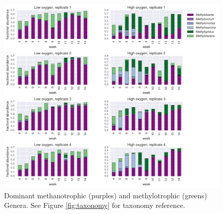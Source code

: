 \begin{figure}[H]
\centering
    \includegraphics[width=1.0\textwidth]{./tex/chapter2/figures/170313_methanotroph_methylotroph_taxa--portrait.pdf}  %
    \begin{singlespace}
    \caption[Dominant methanotrophic and methylotrophic Genera.]{
        Dominant methanotrophic (purples) and methylotrophic (greens) Genera.
        See Figure \ref{fig:taxonomy} for taxonomy reference.}
    \label{fig:dominant_genera}
    \end{singlespace}
\end{figure}


